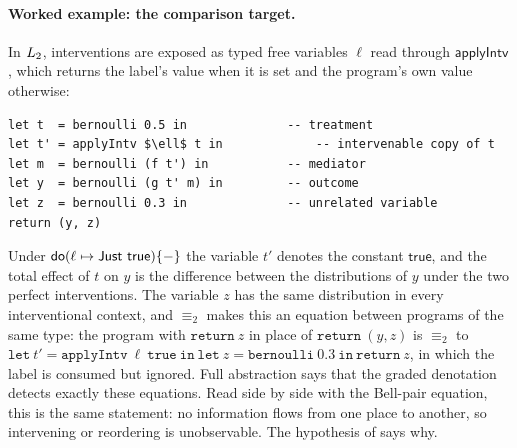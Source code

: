 \paragraph{Worked example: the comparison target.} In $L_{2}$, interventions are exposed as typed free variables $\ell$ read through $\mathsf{applyIntv}$, which returns the label's value when it is set and the program's own value otherwise:
\begin{lstlisting}
let t  = bernoulli 0.5 in              -- treatment
let t' = applyIntv $\ell$ t in             -- intervenable copy of t
let m  = bernoulli (f t') in           -- mediator
let y  = bernoulli (g t' m) in         -- outcome
let z  = bernoulli 0.3 in              -- unrelated variable
return (y, z)
\end{lstlisting}
Under $\dok(\ell\mapsto\mathsf{Just}\ \mathsf{true})\{-\}$ the variable $t'$ denotes the constant $\mathsf{true}$, and the total effect of $t$ on $y$ is the difference between the distributions of $y$ under the two perfect interventions. The variable $z$ has the same distribution in every interventional context, and $\equiv_2$ makes this an equation between programs of the same type: the program with $\mathtt{return}\ z$ in place of $\mathtt{return}\ (y,z)$ is $\equiv_2$ to $\mathtt{let}\ t' = \mathtt{applyIntv}\ \ell\ \mathtt{true}\ \mathtt{in}\ \mathtt{let}\ z = \mathtt{bernoulli}\ 0.3\ \mathtt{in}\ \mathtt{return}\ z$, in which the label is consumed but ignored. Full abstraction says that the graded denotation detects exactly these equations. Read side by side with the Bell-pair equation, this is the same statement: no information flows from one place to another, so intervening or reordering is unobservable. The hypothesis of  says why.

